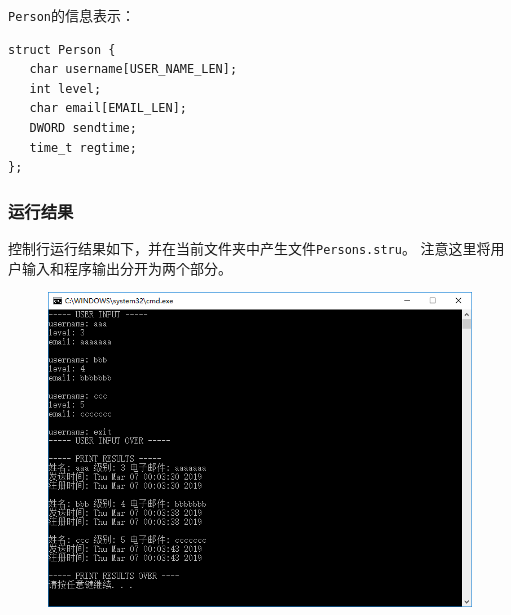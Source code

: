 \documentclass[logo,reportComp]{thesis}
\begin{document}
\verb'Person'的信息表示：
\begin{lstlisting}
struct Person {
   char username[USER_NAME_LEN];
   int level;
   char email[EMAIL_LEN];
   DWORD sendtime;
   time_t regtime;
}; 
\end{lstlisting}

\subsubsection{运行结果}
控制行运行结果如下，并在当前文件夹中产生文件\verb'Persons.stru'。
注意这里将用户输入和程序输出分开为两个部分。
\begin{figure}[H]
\centering
\includegraphics[width=0.8\linewidth]{fig/StructSave.PNG}
\end{figure}
\end{document}
